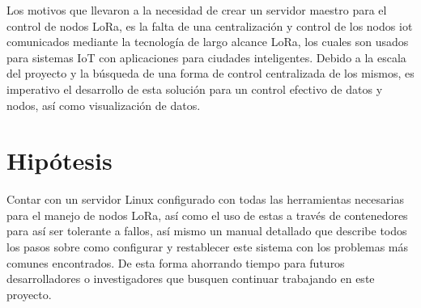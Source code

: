 Los motivos que llevaron a la necesidad de crear un servidor maestro para el control de nodos
\Gls{LoRa}, es la falta de una centralización y control de los nodos  \gls{iot} comunicados mediante
la tecnología de largo alcance LoRa, los cuales son usados para sistemas IoT con aplicaciones para
ciudades inteligentes. Debido a la escala del proyecto y la búsqueda de una forma de control
centralizada de los mismos, es imperativo el desarrollo de esta solución para un control efectivo de
datos y nodos, así como visualización de datos.

\section{Hipótesis} \label{Hipotesis}

Contar con un servidor Linux configurado con todas las herramientas necesarias para el manejo de
nodos \Gls{LoRa}, así como el uso de estas a través de contenedores para así ser tolerante a fallos,
así mismo un manual detallado que describe todos los pasos sobre como configurar y restablecer este
sistema con los problemas más comunes encontrados. De esta forma ahorrando tiempo para futuros
desarrolladores o investigadores que busquen continuar trabajando en este proyecto.
